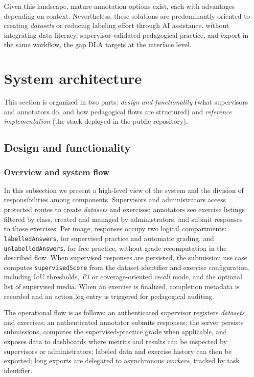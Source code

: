 \documentclass[runningheads]{llncs}
\begin{document}
Given this landscape, mature annotation options exist, each with advantages depending on context. Nevertheless, these solutions are predominantly oriented to creating \textit{datasets} or reducing labeling effort through AI assistance, without integrating data literacy, supervisor-validated pedagogical practice, and export in the same workflow, the gap DLA targets at the interface level.

\section{System architecture}\label{sec:arquitetura}

This section is organized in two parts: \emph{design and functionality} (what supervisors and annotators do, and how pedagogical flows are structured) and \emph{reference implementation} (the stack deployed in the public repository).

\subsection{Design and functionality}

\subsubsection{Overview and system flow}

In this subsection we present a high-level view of the system and the division of responsibilities among components. Supervisors and administrators access protected routes to create \textit{datasets} and exercises; annotators see exercise listings filtered by class, created and managed by administrators, and submit responses to those exercises. Per image, responses occupy two logical compartments: \texttt{labelledAnswers}, for supervised practice and automatic grading, and \texttt{unlabelledAnswers}, for free practice, without grade recomputation in the described flow. When supervised responses are persisted, the submission use case computes \texttt{supervisedScore} from the dataset identifier and exercise configuration, including IoU thresholds, \emph{F1} or coverage-oriented \emph{recall} mode, and the optional list of supervised media. When an exercise is finalized, completion metadata is recorded and an action log entry is triggered for pedagogical auditing.

The operational flow is as follows: an authenticated supervisor registers \textit{datasets} and exercises; an authenticated annotator submits responses; the server persists submissions, computes the supervised-practice grade when applicable, and exposes data to dashboards where metrics and results can be inspected by supervisors or administrators; labeled data and exercise history can then be exported; long exports are delegated to asynchronous \emph{workers}, tracked by task identifier.
\end{document}
